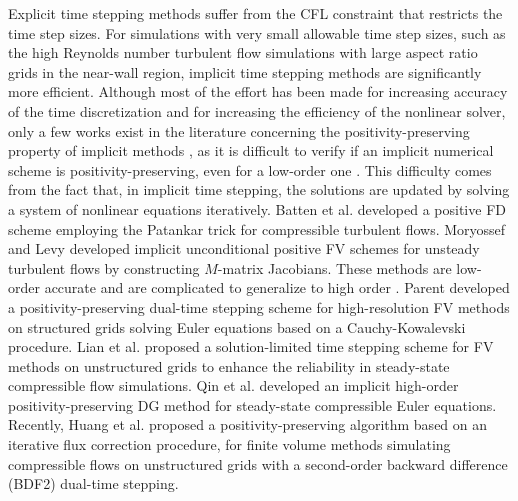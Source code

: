 Explicit time stepping methods suffer from the CFL constraint that restricts the time step sizes.
For simulations with very small allowable time step sizes, such as the high Reynolds number turbulent flow simulations with large aspect ratio grids in the near-wall region, implicit time stepping methods are significantly more efficient.
Although most of the effort has been made for increasing accuracy of the time discretization and for increasing the efficiency of the nonlinear solver, only a few works exist in the literature concerning the positivity-preserving property of implicit methods \cite{qin2018implicit}, as it is difficult to verify if an implicit numerical scheme is positivity-preserving, even for a low-order one \cite{huang2024general}. This difficulty comes from the fact that, in implicit time stepping, the solutions are updated by solving a system of nonlinear equations iteratively. Batten et al. \cite{batten1997average} developed a positive FD scheme employing the Patankar trick \cite{patankar2018numerical} for compressible turbulent flows. Moryossef and Levy \cite{moryossef2006unconditionally,mor2009unconditionally} developed implicit unconditional positive FV schemes for unsteady turbulent flows by constructing $M$-matrix Jacobians. These methods are low-order accurate and are complicated to generalize to high order \cite{qin2018implicit}. Parent \cite{parent2018positivity} developed a positivity-preserving dual-time stepping scheme for high-resolution FV methods on structured grids solving Euler equations based on a Cauchy-Kowalevski procedure. Lian et al. \cite{lian2009solution} proposed a solution-limited time stepping scheme for FV methods on unstructured grids to enhance the reliability in steady-state compressible flow simulations.  Qin et al. \cite{qin2018implicit} developed an implicit high-order positivity-preserving DG method for steady-state compressible Euler equations. Recently, Huang et al. \cite{huang2024general} proposed a positivity-preserving algorithm based on an iterative flux correction procedure, for finite volume methods simulating compressible flows on unstructured grids with a second-order backward difference (BDF2) dual-time stepping.

